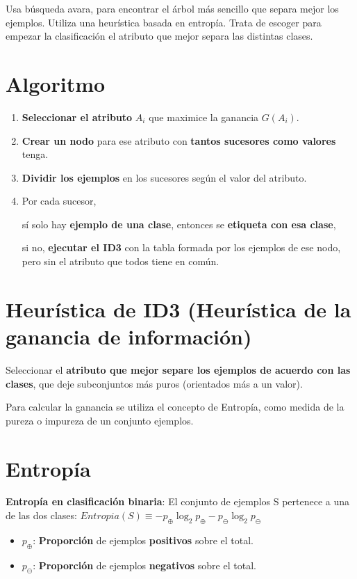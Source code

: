 \documentclass[12pt, twoside, openright]{report} %
\begin{document}
Usa búsqueda avara, para encontrar el árbol más sencillo que separa mejor los ejemplos. Utiliza una heurística basada en entropía. Trata de escoger para empezar la clasificación el atributo que mejor separa las distintas clases.

\section{Algoritmo}

\begin{enumerate}
	\def\labelenumi{\arabic{enumi}.}
	\item \textbf{Seleccionar el atributo} \(A_i\) que maximice la ganancia \(G(A_i)\).
	\item \textbf{Crear un nodo} para ese atributo con \textbf{tantos sucesores como valores} tenga.
	\item \textbf{Dividir los ejemplos} en los sucesores según el valor del atributo.
	\item Por cada sucesor,

	      sí solo hay \textbf{ejemplo de una clase}, entonces se \textbf{etiqueta con esa clase},

	      si no, \textbf{ejecutar el ID3} con la tabla formada por los ejemplos de ese nodo, pero sin el atributo que todos tiene en común.
\end{enumerate}

\section{Heurística de ID3 (Heurística de la ganancia de
  información)}

Seleccionar el \textbf{atributo que mejor separe los ejemplos de acuerdo con las clases}, que deje subconjuntos más puros (orientados más a un valor).

Para calcular la ganancia se utiliza el concepto de Entropía, como medida de la pureza o impureza de un conjunto ejemplos.
\pagebreak
\section{Entropía}

\textbf{Entropía en clasificación binaria}: El conjunto de ejemplos S pertenece a una de las dos clases: \textbf{\(Entropia(S) \equiv -p_\oplus \log _2 p_\oplus -p_\ominus \log _2 p_\ominus\)}

\begin{itemize}
	\item \(p_\oplus\): \textbf{Proporción} de ejemplos \textbf{positivos} sobre el total.
	\item \(p_\ominus\): \textbf{Proporción} de ejemplos \textbf{negativos} sobre el total.
\end{itemize}
\end{document}
